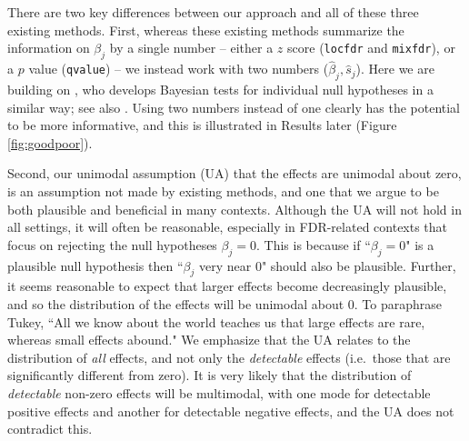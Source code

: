 \documentclass[11pt]{article}
\def\bhat{\hat{\beta}}
\def\shat{\hat{s}}
\def\qvalue{{\tt qvalue}\xspace}
\def\locfdr{{\tt locfdr}\xspace}
\def\mixfdr{{\tt mixfdr}\xspace}
\begin{document}
There are two key differences between our approach and all of these three existing methods. First, 
whereas these existing methods summarize the information on $\beta_j$ by a single number -- either a $z$ score (\locfdr and \mixfdr), or a $p$ value (\qvalue) -- 
we instead work with two numbers ($\bhat_j,\shat_j$). Here we are building on \cite{wakefield:2009}, who develops Bayesian tests 
for individual null hypotheses in a similar way; see also \cite{efron1993bayes}.
Using two numbers instead of one clearly has the potential to be more informative, and this is illustrated in Results later (Figure \ref{fig:goodpoor}).


Second, our unimodal assumption (UA) that the effects are unimodal about zero, is an assumption 
not made by existing methods, and one that we argue to be both plausible and beneficial in many contexts.
Although the UA will not hold in all settings, it will often be reasonable, especially in FDR-related contexts
that focus on rejecting the null hypotheses $\beta_j=0$. This is because if ``$\beta_j=0$" is a plausible null hypothesis
then ``$\beta_j$ very near 0" should also be plausible. Further, it seems reasonable to expect that larger effects become
decreasingly plausible, and so the distribution of the effects will be unimodal about 0. 
To paraphrase Tukey, ``All we know about the world teaches us that large effects are rare, whereas small effects abound."
We emphasize that the UA relates to the distribution of {\it all} effects, and not only the {\it detectable} effects (i.e.~those that are significantly different from zero). It is very likely that the distribution of {\it detectable} non-zero effects will be multimodal, with one mode for detectable positive effects and another for detectable negative effects, and the UA does not contradict this.

\end{document}
